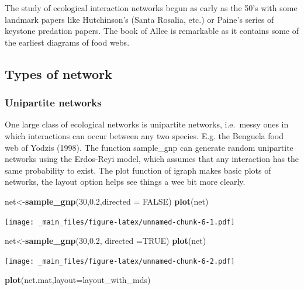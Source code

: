 \documentclass[
]{book}
\newenvironment{Shaded}{\begin{snugshade}}{\end{snugshade}}
\newcommand{\AttributeTok}[1]{\textcolor[rgb]{0.13,0.29,0.53}{#1}}
\newcommand{\ConstantTok}[1]{\textcolor[rgb]{0.56,0.35,0.01}{#1}}
\newcommand{\DecValTok}[1]{\textcolor[rgb]{0.00,0.00,0.81}{#1}}
\newcommand{\FloatTok}[1]{\textcolor[rgb]{0.00,0.00,0.81}{#1}}
\newcommand{\FunctionTok}[1]{\textcolor[rgb]{0.13,0.29,0.53}{\textbf{#1}}}
\newcommand{\NormalTok}[1]{#1}
\newcommand{\OtherTok}[1]{\textcolor[rgb]{0.56,0.35,0.01}{#1}}
\theoremstyle{definition}
\theoremstyle{definition}
\theoremstyle{definition}
\theoremstyle{definition}
\theoremstyle{remark}
\begin{document}
The study of ecological interaction networks begun as early as the 50's with some landmark papers like Hutchinson's (Santa Rosalia, etc.) or Paine's series of keystone predation papers. The book of Allee is remarkable as it contains some of the earliest diagrams of food webs.

\subsection{Types of network}\label{types-of-network}

\subsubsection{Unipartite networks}\label{unipartite-networks}

One large class of ecological networks is unipartite networks, i.e.~messy ones in which interactions can occur between any two species. E.g. the Benguela food web of Yodzis (1998).
The function sample\_gnp can generate random unipartite networks using the Erdos-Reyi model, which assumes that any interaction has the same probability to exist.
The plot function of igraph makes basic plots of networks, the layout option helps see things a wee bit more clearly.

\begin{Shaded}
\begin{Highlighting}[]
\NormalTok{net}\OtherTok{\textless{}{-}}\FunctionTok{sample\_gnp}\NormalTok{(}\DecValTok{30}\NormalTok{,}\FloatTok{0.2}\NormalTok{,}\AttributeTok{directed =} \ConstantTok{FALSE}\NormalTok{)}
\FunctionTok{plot}\NormalTok{(net)}
\end{Highlighting}
\end{Shaded}

\texttt{[image: \_main\_files/figure-latex/unnamed-chunk-6-1.pdf]}

\begin{Shaded}
\begin{Highlighting}[]
\NormalTok{net}\OtherTok{\textless{}{-}}\FunctionTok{sample\_gnp}\NormalTok{(}\DecValTok{30}\NormalTok{,}\FloatTok{0.2}\NormalTok{, }\AttributeTok{directed =}\ConstantTok{TRUE}\NormalTok{)}
\FunctionTok{plot}\NormalTok{(net)}
\end{Highlighting}
\end{Shaded}

\texttt{[image: \_main\_files/figure-latex/unnamed-chunk-6-2.pdf]}

\begin{Shaded}
\begin{Highlighting}[]
\FunctionTok{plot}\NormalTok{(net.mat,}\AttributeTok{layout=}\NormalTok{layout\_with\_mds)}
\end{Highlighting}
\end{Shaded}
\end{document}
